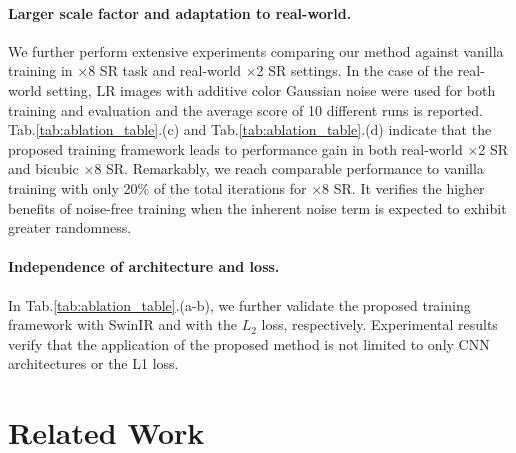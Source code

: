 \documentclass[letterpaper]{article} %
\begin{document}
\paragraph{Larger scale factor and adaptation to real-world.}
We further perform extensive experiments comparing our method against vanilla training in $\times$8 SR task and real-world $\times$2 SR settings. 
In the case of the real-world setting, LR images with additive color Gaussian noise were used for both training and evaluation and the average score of 10 different runs is reported. 
Tab.\ref{tab:ablation_table}.(c) and Tab.\ref{tab:ablation_table}.(d)
indicate that the proposed training framework leads to performance gain in both real-world $\times$2 SR and bicubic $\times$8 SR. Remarkably, we reach comparable performance to vanilla training with only 20$\%$ of the total iterations for $\times$8 SR. It verifies the higher benefits of noise-free training when the inherent noise term is expected to exhibit greater randomness.


\paragraph{Independence of architecture and loss.}
In Tab.\ref{tab:ablation_table}.(a-b), we further validate the proposed training framework with SwinIR \cite{liang2021swinir} and with the $L_2$ loss, respectively.
Experimental results verify that the application of the proposed method is not limited to only CNN architectures or the L1 loss.








\section{Related Work}
%
\end{document}
